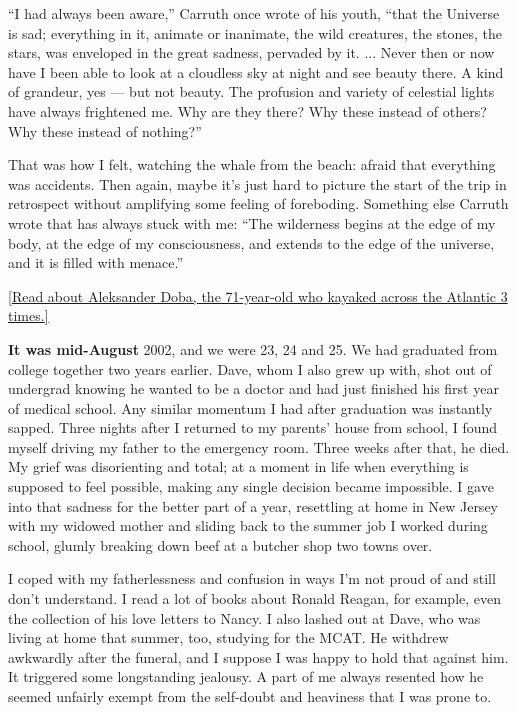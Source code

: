 ``I had always been aware,'' Carruth once wrote of his youth, ``that the
Universe is sad; everything in it, animate or inanimate, the wild
creatures, the stones, the stars, was enveloped in the great sadness,
pervaded by it. ... Never then or now have I been able to look at a
cloudless sky at night and see beauty there. A kind of grandeur, yes ---
but not beauty. The profusion and variety of celestial lights have
always frightened me. Why are they there? Why these instead of others?
Why these instead of nothing?''

That was how I felt, watching the whale from the beach: afraid that
everything was accidents. Then again, maybe it's just hard to picture
the start of the trip in retrospect without amplifying some feeling of
foreboding. Something else Carruth wrote that has always stuck with me:
``The wilderness begins at the edge of my body, at the edge of my
consciousness, and extends to the edge of the universe, and it is filled
with menace.''

\href{https://www.nytimes3xbfgragh.onion/interactive/2018/03/22/magazine/voyages-kayaking-across-ocean-at-70.html}{{[}Read
about Aleksander Doba, the 71-year-old who kayaked across the Atlantic 3
times.{]}}

\textbf{It was mid-August} 2002, and we were 23, 24 and 25. We had
graduated from college together two years earlier. Dave, whom I also
grew up with, shot out of undergrad knowing he wanted to be a doctor and
had just finished his first year of medical school. Any similar momentum
I had after graduation was instantly sapped. Three nights after I
returned to my parents' house from school, I found myself driving my
father to the emergency room. Three weeks after that, he died. My grief
was disorienting and total; at a moment in life when everything is
supposed to feel possible, making any single decision became impossible.
I gave into that sadness for the better part of a year, resettling at
home in New Jersey with my widowed mother and sliding back to the summer
job I worked during school, glumly breaking down beef at a butcher shop
two towns over.

I coped with my fatherlessness and confusion in ways I'm not proud of
and still don't understand. I read a lot of books about Ronald Reagan,
for example, even the collection of his love letters to Nancy. I also
lashed out at Dave, who was living at home that summer, too, studying
for the MCAT. He withdrew awkwardly after the funeral, and I suppose I
was happy to hold that against him. It triggered some longstanding
jealousy. A part of me always resented how he seemed unfairly exempt
from the self-doubt and heaviness that I was prone to.

